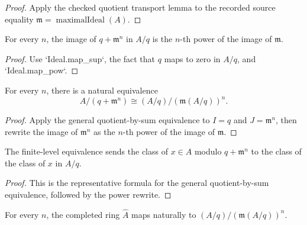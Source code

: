 \begin{proof}
  Apply the checked quotient transport lemma to the recorded source equality
  \(\mathfrak m=\operatorname{maximalIdeal}(A)\).
\end{proof}

\begin{lemma}
  \label{lem:quotient_map_sup_power}
  For every \(n\), the image of \(q+\mathfrak m^n\) in \(A/q\) is the
  \(n\)-th power of the image of \(\mathfrak m\).
\end{lemma}

\begin{proof}
  Use `Ideal.map_sup`, the fact that \(q\) maps to zero in \(A/q\), and
  `Ideal.map_pow`.
\end{proof}

\begin{definition}
  \label{def:quotient_power_quotient_equiv}
  For every \(n\), there is a natural equivalence
  \[
    A/(q+\mathfrak m^n)\cong
      (A/q)/(\mathfrak m(A/q))^n.
  \]
\end{definition}

\begin{proof}
  Apply the general quotient-by-sum equivalence to \(I=q\) and
  \(J=\mathfrak m^n\), then rewrite the image of \(\mathfrak m^n\) as the
  \(n\)-th power of the image of \(\mathfrak m\).
\end{proof}

\begin{lemma}
  \label{lem:quotient_power_quotient_equiv_mk}
  The finite-level equivalence sends the class of \(x\in A\) modulo
  \(q+\mathfrak m^n\) to the class of the class of \(x\) in \(A/q\).
\end{lemma}

\begin{proof}
  This is the representative formula for the general quotient-by-sum
  equivalence, followed by the power rewrite.
\end{proof}

\begin{definition}
  \label{def:completed_ring_to_quotient_finite}
  For every \(n\), the completed ring \(\widehat A\) maps naturally to
  \((A/q)/(\mathfrak m(A/q))^n\).
\end{definition}

